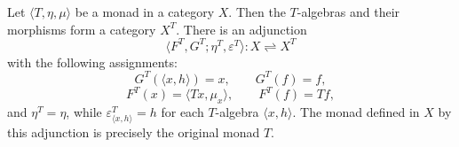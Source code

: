 Let $\langle T, \eta, \mu \rangle$ be a monad in a category $X$. Then the $T$-algebras and their morphisms form a category $X^T$. There is an adjunction
$$
\langle F^T, G^T; \eta^T, \varepsilon^T \rangle: X \rightleftharpoons X^T
$$
with the following assignments:
$$
G^T(\langle x, h \rangle) = x, \qquad G^T(f) = f,
$$
$$
F^T(x) = \langle Tx, \mu_x \rangle, \qquad F^T(f) = Tf,
$$
and $\eta^T = \eta$, while $\varepsilon^T_{\langle x, h \rangle} = h$ for each $T$-algebra $\langle x, h \rangle$. The monad defined in $X$ by this adjunction is precisely the original monad $T$.
